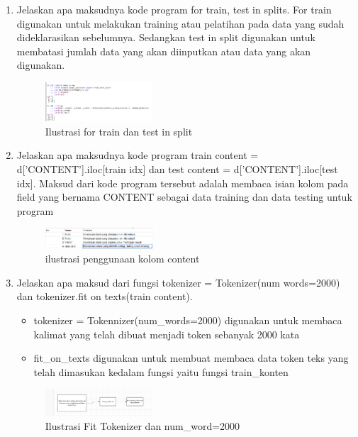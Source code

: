 \begin{enumerate}
	\item Jelaskan apa maksudnya kode program for train, test in splits.
	\hfill\break
	For train digunakan untuk melakukan training atau pelatihan pada data yang sudah dideklarasikan sebelumnya. Sedangkan test in split digunakan untuk membatasi jumlah data yang akan diinputkan atau data yang akan digunakan.
    \begin{figure}[H]
        \centering
            \includegraphics[width=4cm]{figures/1174096/tugas7/teori_3.PNG}
            \caption{Ilustrasi for train dan test in split}
        \end{figure}

	\item Jelaskan apa maksudnya kode program train content = d[’CONTENT’].iloc[train idx] dan test content = d[’CONTENT’].iloc[test idx].
	\hfill\break
	Maksud dari kode program tersebut adalah membaca isian kolom pada ﬁeld yang bernama CONTENT sebagai data training dan data testing untuk program 
    \begin{figure}[H]
	\centering
		\includegraphics[width=4cm]{figures/1174096/tugas7/teori_4.PNG}
		\caption{ilustrasi penggunaan kolom content}
	\end{figure}

	\item Jelaskan apa maksud dari fungsi tokenizer = Tokenizer(num words=2000) dan tokenizer.ﬁt on texts(train content).
	\hfill\break
	\begin{itemize}
        \item tokenizer = Tokennizer(num\_words=2000) digunakan untuk membaca kalimat yang telah dibuat menjadi token sebanyak 2000 kata
        \item fit\_on\_texts digunakan untuk membuat membaca data token teks yang telah dimasukan kedalam fungsi yaitu fungsi train\_konten
    \end{itemize}
	\begin{figure}[H]
	\centering
		\includegraphics[width=4cm]{figures/1174096/tugas7/teori_5.PNG}
		\caption{Ilustrasi Fit Tokenizer dan num\_word=2000}
	\end{figure}


\end{enumerate}
